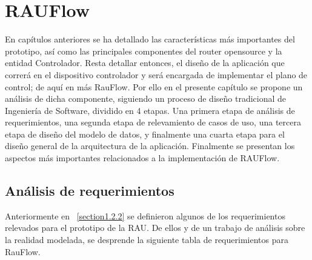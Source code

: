 \chapter{RAUFlow}

\ifpdf
    \graphicspath{{Chapter5/Figs/Raster/}{Chapter5/Figs/PDF/}{Chapter5/Figs/}}
\else
    \graphicspath{{Chapter5/Figs/Vector/}{Chapter5/Figs/}}
\fi

En cap\'itulos anteriores se ha detallado las caracter\'isticas m\'as importantes del prototipo, as\'i como las principales componentes del router opensource y la entidad Controlador. 
Resta detallar entonces, el dise\~no de la aplicaci\'on que correr\'a en el dispositivo controlador y ser\'a encargada de implementar el plano de control; de aqu\'i en m\'as RauFlow. Por ello en el presente cap\'itulo se propone un an\'alisis de dicha componente, siguiendo un proceso de dise\~no tradicional de Ingenier\'ia de Software, dividido en 4 etapas. Una primera etapa de an\'alisis de requerimientos, una segunda etapa de relevamiento de casos de uso, una tercera etapa de dise\~no del modelo de datos, y finalmente una cuarta etapa para el dise\~no general de la arquitectura de la aplicaci\'on. Finalmente se presentan los aspectos m\'as importantes relacionados a la implementaci\'on de RAUFlow. 

\section[An\'alisi de requerimientos]{An\'alisis de requerimientos}

Anteriormente en ~\ref{section1.2.2} se definieron algunos de los requerimientos relevados para el prototipo de la RAU. De ellos y de un trabajo de an\'alisis sobre la realidad modelada, se desprende la siguiente tabla de requerimientos para RauFlow.

